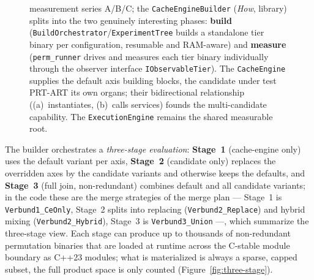 \begin{nurlang}
\begin{figure}[!htbp]
{  measurement series A/B/C\@; the \texttt{CacheEngineBuilder} (\emph{How}, library) splits into the two
  genuinely interesting phases: \textbf{build} (\texttt{BuildOrchestrator}/\texttt{ExperimentTree} builds
  a standalone tier binary per configuration, resumable and RAM-aware) and \textbf{measure}
  (\texttt{perm\_runner} drives and measures each tier binary individually through the observer interface
  \texttt{IObservableTier}). The
  \texttt{CacheEngine} supplies the default axis building blocks, the candidate under test PRT-ART its own organs;
  their bidirectional relationship ((a)~instantiates, (b)~calls services) founds the multi-candidate capability. The
  \texttt{ExecutionEngine} remains the shared measurable root.}\label{fig:m-model}
\end{figure}

The builder orchestrates a \emph{three-stage evaluation}: \textbf{Stage~1} (cache-engine only) uses the
default variant per axis, \textbf{Stage~2} (candidate only) replaces the overridden axes by the
candidate variants and otherwise keeps the defaults, and \textbf{Stage~3} (full join, non-redundant)
combines default and all candidate variants; in the code these are the merge strategies of the merge plan
--- Stage~1 is \texttt{Verbund1\_CeOnly}, Stage~2 splits into replacing (\texttt{Verbund2\_Replace}) and
hybrid mixing (\texttt{Verbund2\_Hybrid}), Stage~3 is \texttt{Verbund3\_Union} ---, which summarize the
three-stage view. Each stage can produce up to thousands of non-redundant
permutation binaries that are loaded at runtime across the C-stable module boundary as C++23 modules;
what is materialized is always a sparse, capped subset, the full product space is only
counted (Figure~\ref{fig:three-stage}).


\end{nurlang}
